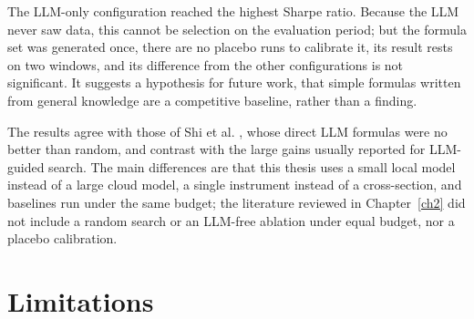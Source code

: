 \documentclass[12pt,a4paper,oneside]{book}
\theoremstyle{definition}
\begin{document}
The LLM-only configuration reached the highest Sharpe ratio. Because the LLM never saw data, this cannot be selection on the evaluation period; but the formula set was generated once, there are no placebo runs to calibrate it, its result rests on two windows, and its difference from the other configurations is not significant. It suggests a hypothesis for future work, that simple formulas written from general knowledge are a competitive baseline, rather than a finding.

The results agree with those of Shi et al. \cite{shi2026}, whose direct LLM formulas were no better than random, and contrast with the large gains usually reported for LLM-guided search. The main differences are that this thesis uses a small local model instead of a large cloud model, a single instrument instead of a cross-section, and baselines run under the same budget; the literature reviewed in Chapter~\ref{ch2} did not include a random search or an LLM-free ablation under equal budget, nor a placebo calibration.

\section{Limitations}
\end{document}
